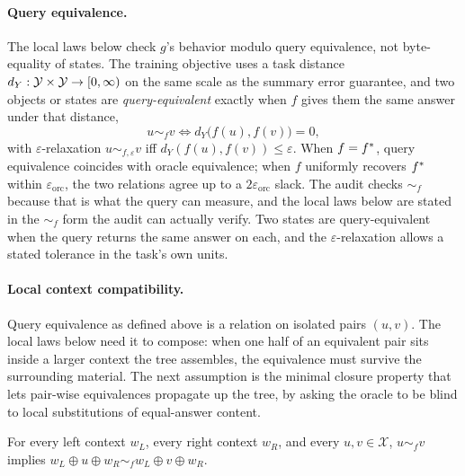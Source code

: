 \paragraph{Query equivalence.}
The local laws below check \(g\)'s behavior modulo query equivalence,
not byte-equality of states. The training objective uses a task distance
\(d_Y:\mathcal{Y}\times\mathcal{Y}\to[0,\infty)\) on the same scale as the summary
error guarantee, and two objects or states are \emph{query-equivalent}
exactly when \(f\) gives them the same answer under that distance,
\[
  u\sim_f v
  \Longleftrightarrow
  d_Y\big(f(u),f(v)\big)=0,
\]
with \(\varepsilon\)-relaxation \(u\sim_{f,\varepsilon} v\) iff
\(d_Y(f(u),f(v))\le\varepsilon\). When \(f=f^\ast\), query equivalence
coincides with oracle equivalence; when \(f\) uniformly recovers
\(f^\ast\) within \(\varepsilon_{\mathrm{orc}}\), the two relations
agree up to a \(2\varepsilon_{\mathrm{orc}}\) slack. The audit checks
\(\sim_f\) because that is what the query can measure, and the local
laws below are stated in the \(\sim_f\) form the audit can actually
verify. Two states are query-equivalent when the query returns the
same answer on each, and the \(\varepsilon\)-relaxation allows a
stated tolerance in the task's own units.

\paragraph{Local context compatibility.}
Query equivalence as defined above is a relation on isolated pairs
\((u,v)\). The local laws below need it to compose: when one half of
an equivalent pair sits inside a larger context the tree assembles,
the equivalence must survive the surrounding material. The next
assumption is the minimal closure property that lets pair-wise
equivalences propagate up the tree, by asking the oracle to be blind
to local substitutions of equal-answer content.

\begin{assumption}
\label{ass:context}
For every left context \(w_L\), every right context \(w_R\), and
every \(u,v\in\mathcal{X}\), \(u\sim_f v\) implies
\(w_L\oplus u\oplus w_R
  \sim_f w_L\oplus v\oplus w_R\).
\end{assumption}

